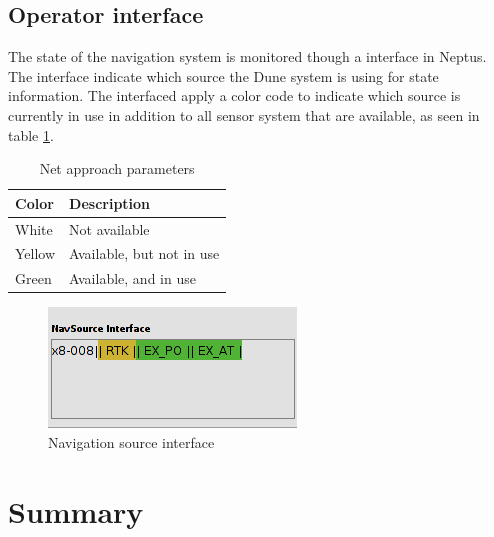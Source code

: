 \subsection{Operator interface}
The state of the navigation system is monitored though a interface in Neptus. The interface indicate which source the Dune system is using for state information. The interfaced apply a color code to indicate which source is currently in use in addition to all sensor system that are available, as seen in table \ref{Tb:Color Code}.
\begin{table}[H]
\begin{center}
    \begin{tabular}{ | l | l |}
    \hline
    \textbf{Color} & \textbf{Description} \\ \hline
    White & Not available \\ \hline
    Yellow & Available, but not in use \\ \hline
    Green & Available, and in use \\ \hline
    \end{tabular}
\end{center}
\caption{Net approach parameters }
\label{Tb:Color Code}
\end{table}
\begin{figure}
\centering
\includegraphics[scale=0.6]{figs/NavSourceInterface.png}
\caption{Navigation source interface}
\label{Fig:NavsourceInterface}
\end{figure}
\section{Summary}